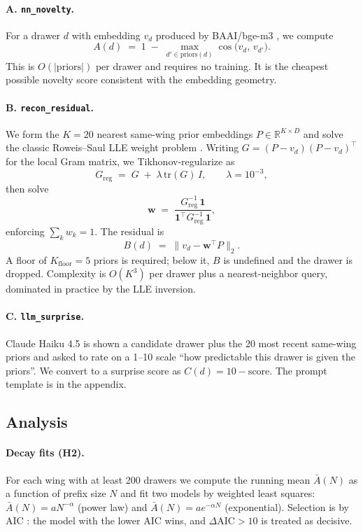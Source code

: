 \documentclass[11pt]{article}
\begin{document}
\paragraph{A. \texttt{nn\_novelty}.}
For a drawer $d$ with embedding $v_d$ produced by BAAI/bge-m3
\citep{bgem3}, we compute
\[
  A(d) \;=\; 1 \;-\; \max_{d' \in \mathrm{priors}(d)} \cos\!\bigl(v_d,\, v_{d'}\bigr).
\]
This is $O(|\mathrm{priors}|)$ per drawer and requires no training. It is
the cheapest possible novelty score consistent with the embedding
geometry.

\paragraph{B. \texttt{recon\_residual}.}
We form the $K = 20$ nearest same-wing prior embeddings $P \in
\mathbb{R}^{K \times D}$ and solve the classic Roweis--Saul LLE weight
problem \citep{roweis2000lle}. Writing $G = (P - v_d)(P - v_d)^\top$ for
the local Gram matrix, we Tikhonov-regularize \citep{tikhonov1963} as
\[
  G_{\mathrm{reg}} \;=\; G \;+\; \lambda \, \mathrm{tr}(G) \, I,
  \qquad \lambda = 10^{-3},
\]
then solve
\[
  \mathbf{w} \;=\; \frac{G_{\mathrm{reg}}^{-1}\,\mathbf{1}}
                        {\mathbf{1}^\top G_{\mathrm{reg}}^{-1}\,\mathbf{1}},
\]
enforcing $\sum_k w_k = 1$. The residual is
\[
  B(d) \;=\; \bigl\| v_d - \mathbf{w}^\top P \bigr\|_2.
\]
A floor of $K_{\mathrm{floor}} = 5$ priors is required; below it, $B$ is
undefined and the drawer is dropped. Complexity is $O(K^3)$ per drawer
plus a nearest-neighbor query, dominated in practice by the LLE
inversion.

\paragraph{C. \texttt{llm\_surprise}.}
Claude Haiku 4.5 is shown a candidate drawer plus the 20 most recent
same-wing priors and asked to rate on a 1--10 scale ``how predictable
this drawer is given the priors''. We convert to a surprise score as
$C(d) = 10 - \mathrm{score}$. The prompt template is in the appendix.

\subsection{Analysis}
\paragraph{Decay fits (H2).}
For each wing with at least 200 drawers we compute the running mean
$\bar{A}(N)$ as a function of prefix size $N$ and fit two models by
weighted least squares:
$\bar{A}(N) = a N^{-\alpha}$ (power law) and
$\bar{A}(N) = a e^{-\alpha N}$ (exponential). Selection is by AIC
\citep{akaike1974}: the model with the lower AIC wins, and
$\Delta \mathrm{AIC} > 10$ is treated as decisive.
\end{document}
